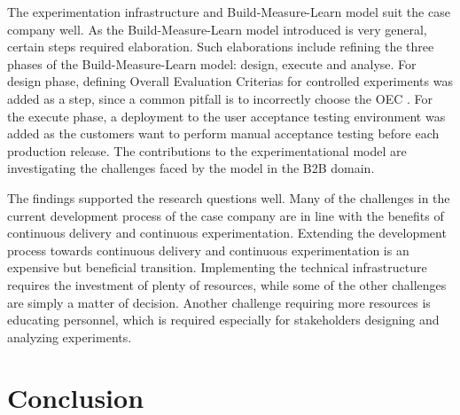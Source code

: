 \documentclass[english]{tktltiki2}
\theoremstyle{definition}
\theoremstyle{remark}
\begin{document}
The experimentation infrastructure and Build-Measure-Learn model \cite{fagerholm2014building} suit the case company well. As the Build-Measure-Learn model introduced is very general, certain steps required elaboration. Such elaborations include refining the three phases of the Build-Measure-Learn model: design, execute and analyse. For design phase, defining Overall Evaluation Criterias for controlled experiments was added as a step, since a common pitfall is to incorrectly choose the OEC \cite{crook2009seven}. For the execute phase, a deployment to the user acceptance testing environment was added as the customers want to perform manual acceptance testing before each production release. The contributions to the experimentational model are investigating the challenges faced by the model in the B2B domain. 

The findings supported the research questions well. Many of the challenges in the current development process of the case company are in line with the benefits of continuous delivery and continuous experimentation. Extending the development process towards continuous delivery and continuous experimentation is an expensive but beneficial transition. Implementing the technical infrastructure requires the investment of plenty of resources, while some of the other challenges are simply a matter of decision. Another challenge requiring more resources is educating personnel, which is required especially for stakeholders designing and analyzing experiments.

\section{Conclusion}
\end{document}
